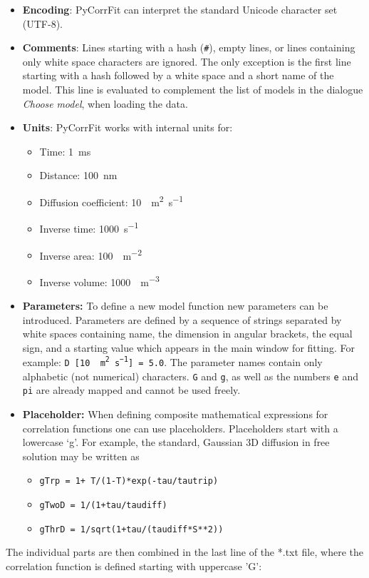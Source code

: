 \begin{itemize}
\item \textbf{Encoding}: PyCorrFit can interpret the standard Unicode character set (UTF-8).
\item \textbf{Comments}: Lines starting with a hash (\texttt{\#}), empty lines, or lines containing only white space characters are ignored. The only exception is the first line starting with a hash followed by a white space and a short name of the model. This line is evaluated to complement the list of models in the dialogue\textit{ Choose }\textit{model}, when loading the data.
\item \textbf{Units}: PyCorrFit works with internal units for:

\begin{itemize}
\item Time: \SI{1}{ms}
\item Distance: \SI{100}{nm}
\item Diffusion coefficient: \SI{10}{\mu m^2s^{-1}} 
\item Inverse time: \SI{1000}{s^{-1}} 
\item Inverse area: \SI{100}{\mu m^{-2}} 
\item Inverse volume: \SI{1000}{\mu m^{-3}} 
\end{itemize}
\item \textbf{Parameters:} To define a new model function new parameters can be introduced. Parameters are defined by a sequence of strings separated by white spaces containing name, the dimension in angular brackets, the equal sign, and a starting value which appears in the main window for fitting. For example: \texttt{D [\SI{10}{\mu m^ 2 s^{-1}}] = 5.0}.
 The parameter names contain only alphabetic (not numerical) characters. \texttt{G} and \texttt{g}, as well as the numbers \texttt{e} and \texttt{pi} are already mapped and cannot be used freely.
\item \textbf{Placeholder:} When defining composite mathematical expressions for correlation functions one can use placeholders. Placeholders start with a lowercase ‘g’. For example, the standard, Gaussian 3D diffusion in free solution may be written as

\begin{itemize}
\item \texttt{gTrp = 1+ T/(1-T)*exp(-tau/tautrip)}
\item \texttt{gTwoD = 1/(1+tau/taudiff)}
\item \texttt{gThrD = 1/sqrt(1+tau/(taudiff*S**2))}
\end{itemize}
\end{itemize}
The individual parts are then combined in the last line of the *.txt file, where the correlation function is defined starting with uppercase ’G’:

